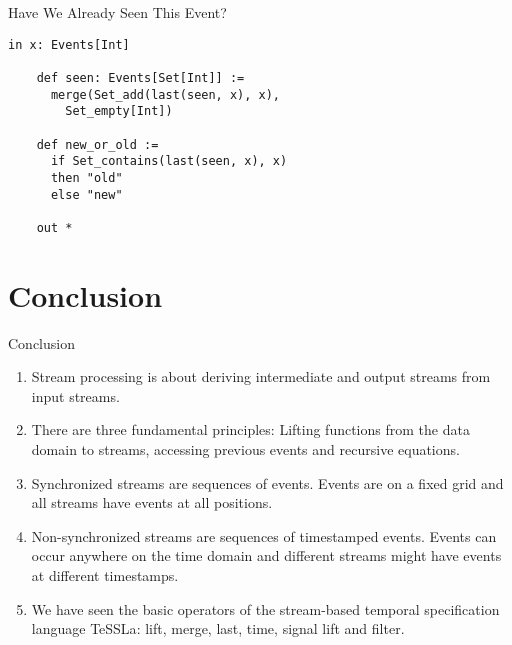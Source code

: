 \begin{frame}[fragile]{Have We Already Seen This Event?}
  \begin{lstlisting}[language=tessla,gobble=4]
    in x: Events[Int]

    def seen: Events[Set[Int]] :=
      merge(Set_add(last(seen, x), x),
        Set_empty[Int])

    def new_or_old :=
      if Set_contains(last(seen, x), x)
      then "old"
      else "new"

    out *
  \end{lstlisting}
\end{frame}

\section*{Conclusion}

\begin{frame}{Conclusion}
  \begin{enumerate}
    \item \alert{Stream processing} is about \alert{deriving} intermediate and output streams from input streams.
    \item There are three \alert{fundamental principles}: \alert{Lifting functions} from the data domain to streams, accessing \alert{previous events} and \alert{recursive} equations.
    \item \alert{Synchronized streams} are \alert{sequences of events}. Events are on a \alert{fixed grid} and all streams have \alert{events at all positions}.
    \item \alert{Non-synchronized streams} are \alert{sequences of timestamped events}. Events can \alert{occur anywhere} on the time domain and different streams might have \alert{events at different timestamps}.
    \item We have seen the \alert{basic operators} of the stream-based temporal specification language \alert{TeSSLa}: \alert{lift}, \alert{merge}, \alert{last}, \alert{time}, \alert{signal lift} and \alert{filter}.
  \end{enumerate}
\end{frame}
